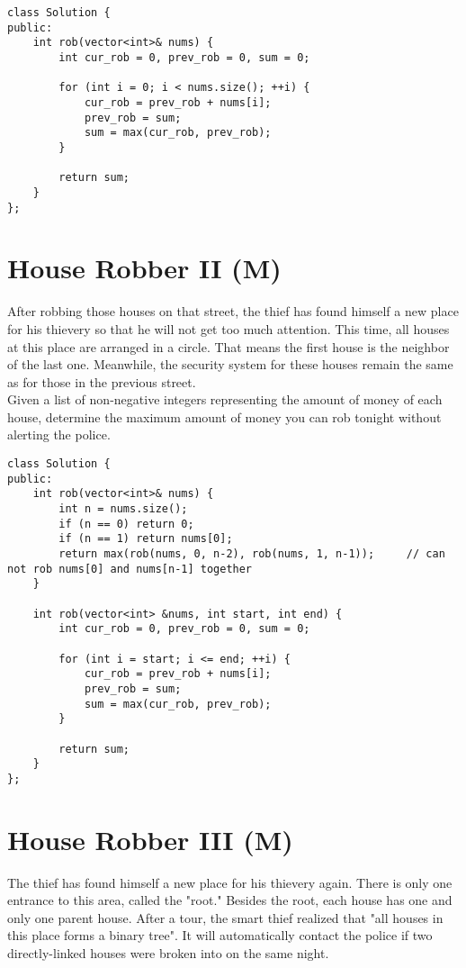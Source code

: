 \begin{lstlisting}
class Solution {
public:
    int rob(vector<int>& nums) {
        int cur_rob = 0, prev_rob = 0, sum = 0;
        
        for (int i = 0; i < nums.size(); ++i) {
            cur_rob = prev_rob + nums[i];
            prev_rob = sum;
            sum = max(cur_rob, prev_rob);
        }
        
        return sum;
    }
};
\end{lstlisting}


\section{House Robber II (M)}
After robbing those houses on that street, the thief has found himself a new place for his thievery so that he will not get too much attention. This time, all houses at this place are arranged in a circle. That means the first house is the neighbor of the last one. Meanwhile, the security system for these houses remain the same as for those in the previous street. \\

Given a list of non-negative integers representing the amount of money of each house, determine the maximum amount of money you can rob tonight without alerting the police.\\

\begin{lstlisting}
class Solution {
public:
    int rob(vector<int>& nums) {
        int n = nums.size();
        if (n == 0) return 0;
        if (n == 1) return nums[0];
        return max(rob(nums, 0, n-2), rob(nums, 1, n-1));     // can not rob nums[0] and nums[n-1] together
    }
    
    int rob(vector<int> &nums, int start, int end) {
        int cur_rob = 0, prev_rob = 0, sum = 0;
        
        for (int i = start; i <= end; ++i) {
            cur_rob = prev_rob + nums[i];
            prev_rob = sum;
            sum = max(cur_rob, prev_rob);
        }
        
        return sum;
    }
};
\end{lstlisting}


\section{House Robber III (M)}
The thief has found himself a new place for his thievery again. There is only one entrance to this area, called the "root." Besides the root, each house has one and only one parent house. After a tour, the smart thief realized that "all houses in this place forms a binary tree". It will automatically contact the police if two directly-linked houses were broken into on the same night. \\

